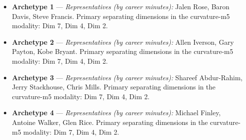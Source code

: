 \begin{itemize}
\item \textbf{Archetype 1} --- \emph{Representatives (by career minutes):} Jalen Rose, Baron Davis, Steve Francis. Primary separating dimensions in the curvature-m5 modality: Dim 7, Dim 4, Dim 2.
\item \textbf{Archetype 2} --- \emph{Representatives (by career minutes):} Allen Iverson, Gary Payton, Kobe Bryant. Primary separating dimensions in the curvature-m5 modality: Dim 7, Dim 4, Dim 2.
\item \textbf{Archetype 3} --- \emph{Representatives (by career minutes):} Shareef Abdur-Rahim, Jerry Stackhouse, Chris Mills. Primary separating dimensions in the curvature-m5 modality: Dim 7, Dim 4, Dim 2.
\item \textbf{Archetype 4} --- \emph{Representatives (by career minutes):} Michael Finley, Antoine Walker, Glen Rice. Primary separating dimensions in the curvature-m5 modality: Dim 7, Dim 4, Dim 2.
\end{itemize}

